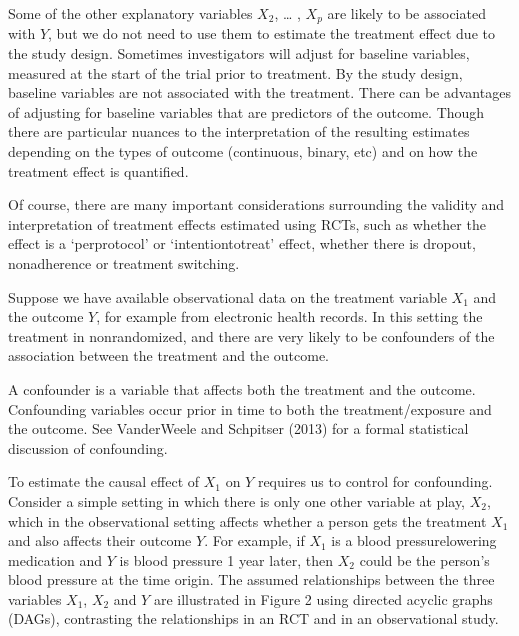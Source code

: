 \documentclass[letterpaper,10pt,english]{jupyterBook}
\begin{document}
\sphinxAtStartPar
Some of the other explanatory variables \(X_{2}\), … , \(X_{p}\) are likely to be associated with \(Y\), but we do not need to use them to estimate the treatment effect due to the study design. Sometimes investigators will adjust for baseline variables, measured at the start of the trial prior to treatment. By the study design, baseline variables are not associated with the treatment. There can be advantages of adjusting for baseline variables that are predictors of the outcome. Though there are particular nuances to the interpretation of the resulting estimates depending on the types of outcome (continuous, binary, etc) and on how the treatment effect is quantified.

\sphinxAtStartPar
Of course, there are many important considerations surrounding the validity and interpretation of
treatment effects estimated using RCTs, such as whether the effect is a ‘per\sphinxhyphen{}protocol’ or ‘intentionto\sphinxhyphen{}treat’ effect, whether there is drop\sphinxhyphen{}out, non\sphinxhyphen{}adherence or treatment switching.

\sphinxAtStartPar
{}

\sphinxAtStartPar
Suppose we have available observational data on the treatment variable \(X_{1}\) and the outcome \(Y\), for example from electronic health records. In this setting the treatment in non\sphinxhyphen{}randomized, and there are very likely to be confounders of the association between the treatment and the outcome.

\sphinxAtStartPar
A confounder is a variable that affects both the treatment and the outcome. Confounding variables occur prior in time to both the treatment/exposure and the outcome. See VanderWeele and Schpitser (2013) for a formal statistical discussion of confounding.

\sphinxAtStartPar
To estimate the causal effect of \(X_{1}\) on \(Y\) requires us to control for confounding. Consider a simple setting in which there is only one other variable at play, \(X_{2}\), which in the observational setting affects whether a person gets the treatment \(X_{1}\) and also affects their outcome \(Y\). For example, if \(X_{1}\) is a blood pressure\sphinxhyphen{}lowering medication and \(Y\) is blood pressure 1 year later, then \(X_{2}\) could be the person’s blood pressure at the time origin. The assumed relationships between the three variables \(X_{1}\), \(X_{2}\) and \(Y\) are illustrated in Figure 2 using directed acyclic graphs (DAGs), contrasting the relationships in an RCT and in an observational study.
\end{document}
